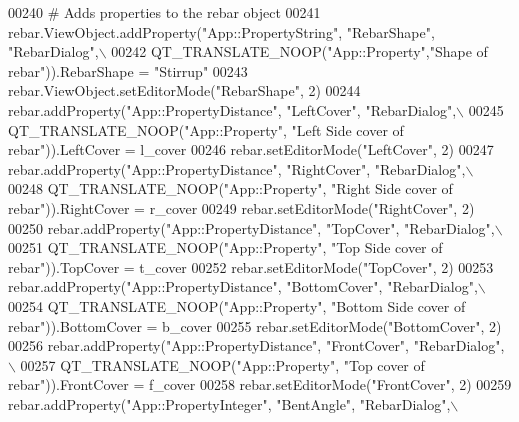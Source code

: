\begin{DoxyCode}
00240     \textcolor{comment}{# Adds properties to the rebar object}
00241     rebar.ViewObject.addProperty(\textcolor{stringliteral}{"App::PropertyString"}, \textcolor{stringliteral}{"RebarShape"}, \textcolor{stringliteral}{"RebarDialog"},\(\backslash\)
00242         QT\_TRANSLATE\_NOOP(\textcolor{stringliteral}{"App::Property"},\textcolor{stringliteral}{"Shape of rebar"})).RebarShape = \textcolor{stringliteral}{"Stirrup"}
00243     rebar.ViewObject.setEditorMode(\textcolor{stringliteral}{"RebarShape"}, 2)
00244     rebar.addProperty(\textcolor{stringliteral}{"App::PropertyDistance"}, \textcolor{stringliteral}{"LeftCover"}, \textcolor{stringliteral}{"RebarDialog"},\(\backslash\)
00245         QT\_TRANSLATE\_NOOP(\textcolor{stringliteral}{"App::Property"}, \textcolor{stringliteral}{"Left Side cover of rebar"})).LeftCover = l\_cover
00246     rebar.setEditorMode(\textcolor{stringliteral}{"LeftCover"}, 2)
00247     rebar.addProperty(\textcolor{stringliteral}{"App::PropertyDistance"}, \textcolor{stringliteral}{"RightCover"}, \textcolor{stringliteral}{"RebarDialog"},\(\backslash\)
00248         QT\_TRANSLATE\_NOOP(\textcolor{stringliteral}{"App::Property"}, \textcolor{stringliteral}{"Right Side cover of rebar"})).RightCover = r\_cover
00249     rebar.setEditorMode(\textcolor{stringliteral}{"RightCover"}, 2)
00250     rebar.addProperty(\textcolor{stringliteral}{"App::PropertyDistance"}, \textcolor{stringliteral}{"TopCover"}, \textcolor{stringliteral}{"RebarDialog"},\(\backslash\)
00251         QT\_TRANSLATE\_NOOP(\textcolor{stringliteral}{"App::Property"}, \textcolor{stringliteral}{"Top Side cover of rebar"})).TopCover = t\_cover
00252     rebar.setEditorMode(\textcolor{stringliteral}{"TopCover"}, 2)
00253     rebar.addProperty(\textcolor{stringliteral}{"App::PropertyDistance"}, \textcolor{stringliteral}{"BottomCover"}, \textcolor{stringliteral}{"RebarDialog"},\(\backslash\)
00254         QT\_TRANSLATE\_NOOP(\textcolor{stringliteral}{"App::Property"}, \textcolor{stringliteral}{"Bottom Side cover of rebar"})).BottomCover = b\_cover
00255     rebar.setEditorMode(\textcolor{stringliteral}{"BottomCover"}, 2)
00256     rebar.addProperty(\textcolor{stringliteral}{"App::PropertyDistance"}, \textcolor{stringliteral}{"FrontCover"}, \textcolor{stringliteral}{"RebarDialog"},\(\backslash\)
00257         QT\_TRANSLATE\_NOOP(\textcolor{stringliteral}{"App::Property"}, \textcolor{stringliteral}{"Top cover of rebar"})).FrontCover = f\_cover
00258     rebar.setEditorMode(\textcolor{stringliteral}{"FrontCover"}, 2)
00259     rebar.addProperty(\textcolor{stringliteral}{"App::PropertyInteger"}, \textcolor{stringliteral}{"BentAngle"}, \textcolor{stringliteral}{"RebarDialog"},\(\backslash\)

\end{DoxyCode}

